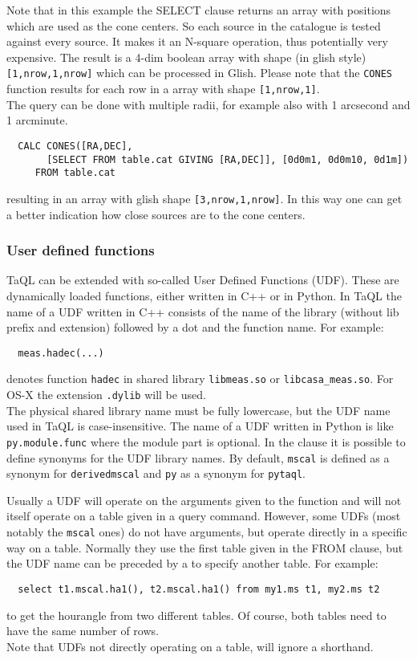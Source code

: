 Note that in this example the SELECT clause returns an array with positions
which are used as the cone centers. So each source in the catalogue is
tested against every source. It makes it an N-square operation, thus
potentially very expensive.
The result is a 4-dim boolean array with shape (in glish style)
\texttt{[1,nrow,1,nrow]} which can be processed in Glish. Please note
that the \texttt{CONES} function results for 
each row in a array with shape \texttt{[1,nrow,1]}.
\\The query can be done with multiple radii, for example also
with 1 arcsecond and 1 arcminute.
\begin{verbatim}
  CALC CONES([RA,DEC],
       [SELECT FROM table.cat GIVING [RA,DEC]], [0d0m1, 0d0m10, 0d1m])
     FROM table.cat
\end{verbatim}
resulting in an array with glish shape \texttt{[3,nrow,1,nrow]}.
In this way one can get a better indication how close sources are to
the cone centers.

\subsubsection{\label{TAQL:UDF}User defined functions}
TaQL can be extended with so-called User Defined Functions (UDF).
These are dynamically loaded functions, either written in C++ or in Python.
In TaQL the name of a UDF written in C++ consists of the name of the
library (without lib prefix and extension) followed by a dot and the function name.
For example:
\begin{verbatim}
  meas.hadec(...)
\end{verbatim}
denotes function \texttt{hadec} in shared library
\texttt{libmeas.so} or \texttt{libcasa\_meas.so}. For
OS-X the extension \texttt{.dylib} will be used.
\\The physical shared library name must be fully lowercase, but the UDF name
used in TaQL is case-insensitive. 
The name of a UDF written in Python is like \texttt{py.module.func}
where the module part is optional.
In the  clause it is
possible to define synonyms for the UDF library names. By default,
\texttt{mscal} is defined as a synonym for \texttt{derivedmscal} and
\texttt{py} as a synonym for \texttt{pytaql}.

Usually a UDF will operate on the arguments given to the function and
will not itself operate on a table given in a query command.
However, some UDFs (most notably the \texttt{mscal} ones) do not have
arguments, but operate directly in a specific way on a table. Normally
they use the first table given in the FROM clause, but the UDF name
can be preceded by a  to specify
another table. For example:
\begin{verbatim}
  select t1.mscal.ha1(), t2.mscal.ha1() from my1.ms t1, my2.ms t2
\end{verbatim}
to get the hourangle from two different tables.
Of course, both tables need to have the same number of rows.
\\Note that UDFs not directly operating on a table, will ignore a shorthand.


